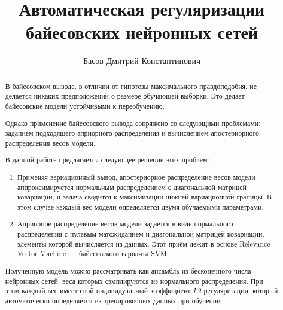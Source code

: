 \documentclass{article}
\title{Автоматическая регуляризации байесовских нейронных сетей}
\author{
    Басов Дмитрий Константинович
}
\date{}
\begin{document}
    \maketitle

    \begin{abstract}
        В байесовском выводе, в отличии от гипотезы максимального правдоподобия,
        не делается никаких предположений о размере обучающей выборки.
        Это делает байесовские модели устойчивыми к переобучению.

        Однако применение байесовского вывода сопряжено со следующими проблемами:
        заданием подходящего априорного распределения и вычислением апостериорного распределения весов модели.

        В данной работе предлагается следующее решение этих проблем:
        \begin{enumerate}
            \item Применяя вариационный вывод,
                апостериорное распределение весов модели аппроксимируется
                нормальным распределением с диагональной матрицей ковариации,
                и задача сводится к максимизации нижней вариационной границы.
                В этом случае каждый вес модели определяется двумя обучаемыми параметрами.
            \item Априорное распределение весов модели задается в виде
                нормального распределения с нулевым матожиданием
                и диагональной матрицей ковариации, элементы которой вычисляется из данных.
                Этот приём лежит в основе Relevance Vector Machine~--- байесовского варианта SVM.
        \end{enumerate}

        Полученную модель можно рассматривать как
        ансамбль из бесконечного числа нейронных сетей,
        веса которых сэмплируются из нормального распределения.
        При этом каждый вес имеет свой индивидуальный коэффициент $L2$ регуляризации,
        который автоматически определяется из тренировочных данных при обучении.

    \end{abstract}
\end{document}
